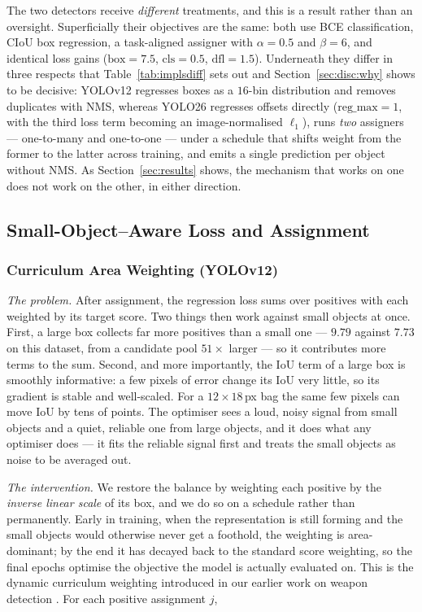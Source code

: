 \documentclass[10pt,twocolumn,a4paper]{article}
\begin{document}
The two detectors receive \emph{different} treatments, and this is a result
rather than an oversight. Superficially their objectives are the same: both use
BCE classification, CIoU \cite{zheng2020ciou} box regression, a task-aligned assigner with
$\alpha=0.5$ and $\beta=6$, and identical loss gains
($\mathrm{box}=7.5$, $\mathrm{cls}=0.5$, $\mathrm{dfl}=1.5$). Underneath they
differ in three respects that Table~\ref{tab:implsdiff} sets out and
Section~\ref{sec:disc:why} shows to be decisive: YOLOv12 regresses boxes as a
$16$-bin distribution and removes duplicates with NMS, whereas YOLO26 regresses
offsets directly ($\mathrm{reg\_max}=1$, with the third loss term becoming an
image-normalised $\ell_1$), runs \emph{two} assigners --- one-to-many and
one-to-one --- under a schedule that shifts weight from the former to the latter
across training, and emits a single prediction per object without NMS. As
Section~\ref{sec:results} shows, the mechanism that works on one does not work on
the other, in either direction.

\subsection{Small-Object--Aware Loss and Assignment}
\label{sec:method:loss}

\subsubsection{Curriculum Area Weighting (YOLOv12)}

\emph{The problem.} After assignment, the regression loss sums over positives
with each weighted by its target score. Two things then work against small
objects at once. First, a large box collects far more positives than a small one
--- $9.79$ against $7.73$ on this dataset, from a candidate pool $51\times$
larger --- so it contributes more terms to the sum. Second, and more importantly,
the IoU term of a large box is smoothly informative: a few pixels of error
change its IoU very little, so its gradient is stable and well-scaled. For a
$12\times18$\,px bag the same few pixels can move IoU by tens of points. The
optimiser sees a loud, noisy signal from small objects and a quiet, reliable one
from large objects, and it does what any optimiser does --- it fits the reliable
signal first and treats the small objects as noise to be averaged out.

\emph{The intervention.} We restore the balance by weighting each positive by
the \emph{inverse linear scale} of its box, and we do so on a schedule rather
than permanently. Early in training, when the representation is still forming and
the small objects would otherwise never get a foothold, the weighting is
area-dominant; by the end it has decayed back to the standard score weighting,
so the final epochs optimise the objective the model is actually evaluated on.
This is the dynamic curriculum weighting introduced in our earlier work on
weapon detection \cite{catargiu2026weapon}. For each positive assignment $j$,
\end{document}
